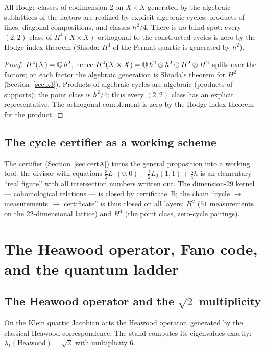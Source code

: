 \begin{proposition}
\label{prop:codim2}
All Hodge classes of codimension 2 on $X\times X$ generated by the
algebraic sublattices of the factors are realized by explicit
algebraic cycles: products of lines, diagonal compositions, and
classes $h^2/4$. There is no blind spot: every $(2,2)$ class of
$H^4(X\times X)$ orthogonal to the constructed cycles is zero by the
Hodge index theorem (Shioda: $H^4$ of the Fermat quartic is
generated by $h^2$).
\end{proposition}

\begin{proof}
$H^4(X)=\mathbb{Q}\,h^2$, hence $H^4(X\times X)=\mathbb{Q}\,h^2\otimes h^2\oplus
H^2\otimes H^2$ splits over the factors; on each factor the
algebraic generation is Shioda's theorem for $H^2$
(Section~\ref{sec:k3}). Products of algebraic cycles are algebraic
(products of supports); the point class is $h^2/4$; thus every
$(2,2)$ class has an explicit representative. The orthogonal
complement is zero by the Hodge index theorem for the product.
\end{proof}

\subsection{The cycle certifier as a working scheme}

The certifier (Section~\ref{sec:certA}) turns the general
proposition into a working tool: the divisor with equations
$\tfrac32L_1(0,0)-\tfrac12L_2(1,1)+\tfrac54h$ is an elementary
``real figure'' with all intersection numbers written out. The
dimension-$29$ kernel --- cohomological relations --- is closed by
certificate~B; the chain ``cycle $\to$ measurements $\to$
certificate'' is thus closed on all layers: $H^2$ ($51$ measurements
on the $22$-dimensional lattice) and $H^4$ (the point class,
zero-cycle pairings).

\section{The Heawood operator, Fano code, and the quantum ladder}
\label{sec:heawood}

\subsection{The Heawood operator and the $\sqrt2$ multiplicity}

On the Klein quartic Jacobian acts the Heawood operator, generated by
the classical Heawood correspondence. The stand computes its
eigenvalues exactly: $\lambda_1(\text{Heawood})=\sqrt2$ with
multiplicity $6$.

